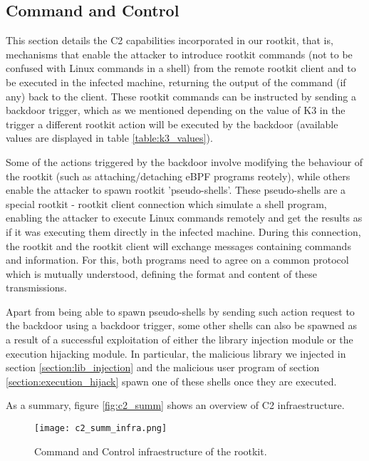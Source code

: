\subsection{Command and Control} \label{subsection:c2}
This section details the C2 capabilities incorporated in our rootkit, that is, mechanisms that enable the attacker to introduce rootkit commands (not to be confused with Linux commands in a shell) from the remote rootkit client and to be executed in the infected machine, returning the output of the command (if any) back to the client. These rootkit commands can be instructed by sending a backdoor trigger, which as we mentioned depending on the value of K3 in the trigger a different rootkit action will be executed by the backdoor (available values are displayed in table \ref{table:k3_values}).

Some of the actions triggered by the backdoor involve modifying the behaviour of the rootkit (such as attaching/detaching eBPF programs reotely), while others enable the attacker to spawn rootkit 'pseudo-shells'. These pseudo-shells are a special rootkit - rootkit client connection which simulate a shell program, enabling the attacker to execute Linux commands remotely and get the results as if it was executing them directly in the infected machine. During this connection, the rootkit and the rootkit client will exchange messages containing commands and information. For this, both programs need to agree on a common protocol which is mutually understood, defining the format and content of these transmissions.

Apart from being able to spawn pseudo-shells by sending such action request to the backdoor using a backdoor trigger, some other shells can also be spawned as a result of a successful exploitation of either the library injection module or the execution hijacking module. In particular, the malicious library we injected in section \ref{section:lib_injection} and the malicious user program of section \ref{section:execution_hijack} spawn one of these shells once they are executed.

As a summary, figure \ref{fig:c2_summ} shows an overview of C2 infraestructure.

\begin{figure}[htbp]
	\centering
	\texttt{[image: c2\_summ\_infra.png]}
	\caption{Command and Control infraestructure of the rootkit.}
	\label{fig:c2_summ_infra}
\end{figure}

